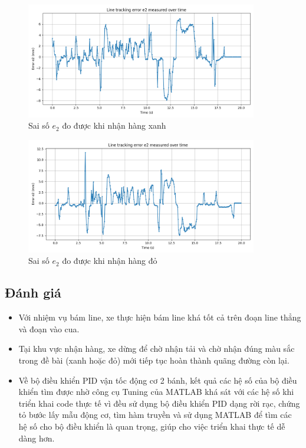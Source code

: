                \begin{figure}[H]
                    \centering
                    \includegraphics[width=0.9\textwidth]{pictures/chapter8/actual_e2_blue.png}
                    \caption{Sai số $e_2$ đo được khi nhận hàng xanh}
                    \label{actual_e2_blue}
               \end{figure}
               \begin{figure}[H]
                    \centering
                    \includegraphics[width=0.9\textwidth]{pictures/chapter8/actual_e2_red.png}
                    \caption{Sai số $e_2$ đo được khi nhận hàng đỏ}
                    \label{actual_e2_red}
               \end{figure}
          \subsection{Đánh giá}
               \begin{itemize}
                    \item Với nhiệm vụ bám line, xe thực hiện bám line khá tốt cả trên đoạn line thẳng và đoạn vào cua.
                    \item Tại khu vực nhận hàng, xe dừng để chờ nhận tải và chờ nhận đúng màu sắc trong đề bài (xanh hoặc đỏ) mới tiếp tục hoàn thành quãng đường còn lại.
                    \item Về bộ điều khiển PID vận tốc động cơ 2 bánh, kết quả các hệ số của bộ điều khiển tìm được nhờ công cụ Tuning của MATLAB khá sát với các hệ số khi triển khai code thực tế vì đều sử dụng bộ điều khiển PID dạng rời rạc, chứng tỏ bước lấy mẫu động cơ, tìm hàm truyền và sử dụng MATLAB để tìm các hệ số cho bộ điều khiển là quan trọng, giúp cho việc triển khai thực tế dễ dàng hơn. 
               \end{itemize}
